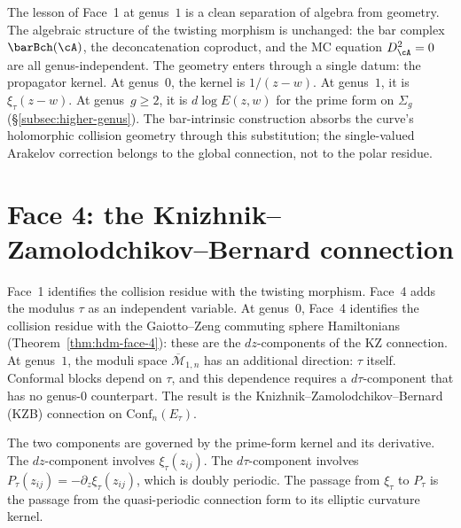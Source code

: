 The lesson of Face~1 at genus~$1$ is a clean separation of algebra
from geometry. The algebraic structure of the twisting morphism is
unchanged: the bar complex $\barBch(\cA)$, the deconcatenation
coproduct, and the MC equation $D_\cA^2 = 0$ are all
genus-independent. The geometry enters through a single datum: the
propagator kernel. At genus~$0$, the kernel is $1/(z-w)$. At
genus~$1$, it is $\xi_\tau(z-w)$. At genus~$g \geq 2$, it is
$d\log E(z,w)$ for the prime form on $\Sigma_g$
(\S\ref{subsec:higher-genus}). The bar-intrinsic construction absorbs
the curve's holomorphic collision geometry through this substitution;
the single-valued Arakelov correction belongs to the global connection,
not to the polar residue.



\section{Face 4: the Knizhnik--Zamolodchikov--Bernard connection}
\label{sec:g1sf-face-4}

Face~1 identifies the collision residue with the twisting morphism.
Face~4 adds the modulus $\tau$ as an independent variable. At
genus~$0$, Face~4 identifies the collision residue with the
Gaiotto--Zeng commuting sphere Hamiltonians
(Theorem~\ref{thm:hdm-face-4}): these are the $dz$-components of the
KZ connection. At genus~$1$, the moduli space
$\overline{\mathcal{M}}_{1,n}$ has an additional direction: $\tau$
itself. Conformal blocks depend on $\tau$, and this dependence
requires a $d\tau$-component that has no genus-$0$ counterpart. The
result is the Knizhnik--Zamolodchikov--Bernard (KZB) connection on
$\mathrm{Conf}_n(E_\tau)$.

The two components are governed by the prime-form kernel and its
derivative. The $dz$-component involves $\xi_\tau(z_{ij})$. The
$d\tau$-component involves $P_\tau(z_{ij})=-\partial_z\xi_\tau(z_{ij})$,
which is doubly periodic. The passage from $\xi_\tau$ to $P_\tau$ is
the passage from the quasi-periodic connection form to its elliptic
curvature kernel.

